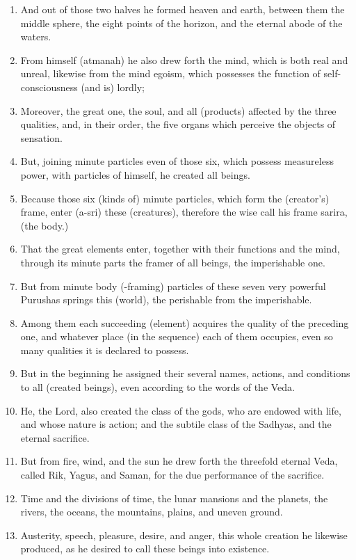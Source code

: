 \begin{enumerate}
\item And out of those two halves he formed heaven and earth, between them the middle sphere, the eight points of the horizon, and the eternal abode of the waters.
\item From himself (atmanah) he also drew forth the mind, which is both real and unreal, likewise from the mind egoism, which possesses the function of self-consciousness (and is) lordly;
\item Moreover, the great one, the soul, and all (products) affected by the three qualities, and, in their order, the five organs which perceive the objects of sensation.
\item But, joining minute particles even of those six, which possess measureless power, with particles of himself, he created all beings.
\item Because those six (kinds of) minute particles, which form the (creator's) frame, enter (a-sri) these (creatures), therefore the wise call his frame sarira, (the body.)
\item That the great elements enter, together with their functions and the mind, through its minute parts the framer of all beings, the imperishable one.
\item But from minute body (-framing) particles of these seven very powerful Purushas springs this (world), the perishable from the imperishable.
\item Among them each succeeding (element) acquires the quality of the preceding one, and whatever place (in the sequence) each of them occupies, even so many qualities it is declared to possess.
\item But in the beginning he assigned their several names, actions, and conditions to all (created beings), even according to the words of the Veda.
\item He, the Lord, also created the class of the gods, who are endowed with life, and whose nature is action; and the subtile class of the Sadhyas, and the eternal sacrifice.
\item But from fire, wind, and the sun he drew forth the threefold eternal Veda, called Rik, Yagus, and Saman, for the due performance of the sacrifice.
\item Time and the divisions of time, the lunar mansions and the planets, the rivers, the oceans, the mountains, plains, and uneven ground.
\item Austerity, speech, pleasure, desire, and anger, this whole creation he likewise produced, as he desired to call these beings into existence.

\end{enumerate}
